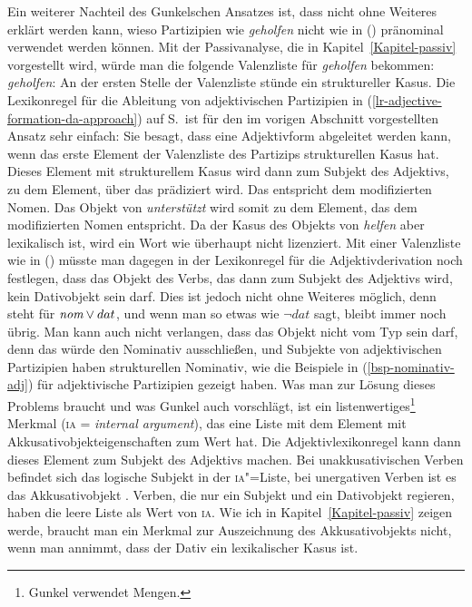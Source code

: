 Ein weiterer Nachteil des Gunkelschen Ansatzes ist, dass nicht ohne Weiteres erklärt werden kann,
wieso Partizipien wie \emph{geholfen} nicht wie in () pränominal verwendet werden können.
\z
Mit der Passivanalyse, die in Kapitel~\ref{Kapitel-passiv} vorgestellt wird, würde man die
folgende Valenzliste für \emph{geholfen} bekommen:
\ea
\emph{geholfen}: 
\z
An der ersten Stelle der Valenzliste stünde ein struktureller Kasus. Die Lexikonregel für die
Ableitung von adjektivischen Partizipien in (\ref{lr-adjective-formation-da-approach}) 
auf S.\,\pageref{lr-adjective-formation-da-approach} ist für den im vorigen Abschnitt vorgestellten
Ansatz sehr einfach: Sie besagt, dass eine Adjektivform abgeleitet werden kann, wenn das
erste Element der Valenzliste des Partizips strukturellen Kasus hat. Dieses Element mit strukturellem
Kasus wird dann zum Subjekt des Adjektivs, \dash zu dem Element, über das prädiziert wird.
Das entspricht dem modifizierten Nomen. Das Objekt von \emph{unterstützt} wird somit zu dem
Element, das dem modifizierten Nomen entspricht. Da der Kasus des Objekts von \emph{helfen}
aber lexikalisch ist, wird ein Wort wie  überhaupt nicht lizenziert. Mit einer
Valenzliste wie in () müsste man dagegen in der Lexikonregel für die Adjektivderivation
noch festlegen, dass das Objekt des Verbs, das dann zum Subjekt des Adjektivs wird,
kein Dativobjekt sein darf. Dies ist jedoch nicht ohne Weiteres möglich, denn 
steht für ${\normalfont\textit{nom}} \vee dat$, und wenn man so etwas wie $\neg dat$ sagt, bleibt immer noch 
übrig. Man kann auch nicht verlangen, dass das Objekt nicht vom Typ  sein darf, denn
das würde den Nominativ ausschließen, und Subjekte von adjektivischen Partizipien haben strukturellen Nominativ,
wie die Beispiele in (\ref{bsp-nominativ-adj}) für adjektivische Partizipien gezeigt haben.
Was man zur Lösung dieses Problems braucht und was Gunkel auch vorschlägt, ist ein listenwertiges\footnote{
  Gunkel verwendet Mengen.%
}
Merkmal (\textsc{ia} = \emph{internal argument}), das eine Liste mit dem Element mit Akkusativobjekteigenschaften zum Wert hat. Die
Adjektivlexikonregel kann dann dieses Element zum Subjekt des Adjektivs machen. Bei unakkusativischen
Verben befindet sich das logische Subjekt in der \textsc{ia}"=Liste, bei unergativen Verben ist es das Akkusativobjekt \citep[]{Gunkel2003b}.
Verben, die nur ein Subjekt und ein Dativobjekt regieren, haben die leere Liste als Wert von \textsc{ia}.
Wie ich in Kapitel~\ref{Kapitel-passiv} zeigen werde, braucht man ein Merkmal zur Auszeichnung des
Akkusativobjekts nicht, wenn man annimmt, dass der Dativ ein lexikalischer Kasus ist.

